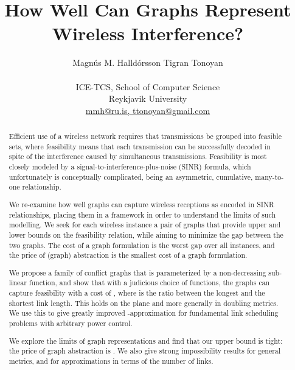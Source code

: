 \documentclass[11pt]{article}
\begin{document}
\begin{titlepage}

\title{How Well Can Graphs Represent Wireless Interference?}

\author{
  Magn\'us M. Halld\'orsson
  \qquad
  Tigran Tonoyan \\ \\
  ICE-TCS, School of Computer Science \\
  Reykjavik University \\
  \url{mmh@ru.is, ttonoyan@gmail.com}
}

\maketitle
\thispagestyle{empty}

\begin{abstract}
  Efficient use of a wireless network requires that transmissions be grouped into feasible sets, where feasibility means
  that each transmission can be successfully decoded in spite of the interference caused by simultaneous transmissions.
  Feasibility is most closely modeled by a signal-to-interference-plus-noise (SINR) formula, which unfortunately is
  conceptually complicated, being an asymmetric, cumulative, many-to-one relationship.

We re-examine how well graphs can capture wireless receptions as encoded in SINR relationships, placing them in a
framework in order to understand the limits of such modelling.  We seek for each wireless instance a pair of graphs that
provide upper and lower bounds on the feasibility relation, while aiming to minimize the gap between the two graphs.
The cost of a graph formulation is the worst gap over all instances, and the price of (graph) abstraction is the
smallest cost of a graph formulation.

We propose a family of conflict graphs that is parameterized by a non-decreasing sub-linear function, and show that with
a judicious choice of functions, the graphs can capture feasibility with a cost of , where  is
the ratio between the longest and the shortest link length.  This holds on the plane and more generally in doubling
metrics.  We use this to give greatly improved -approximation for fundamental link scheduling
problems with arbitrary power control.

We explore the limits of graph representations and find that our upper bound is tight: the price of graph abstraction is
  .  We also give strong impossibility results for general metrics, and for approximations in
  terms of the number of links.
\end{abstract}


\end{titlepage}
\end{document}
